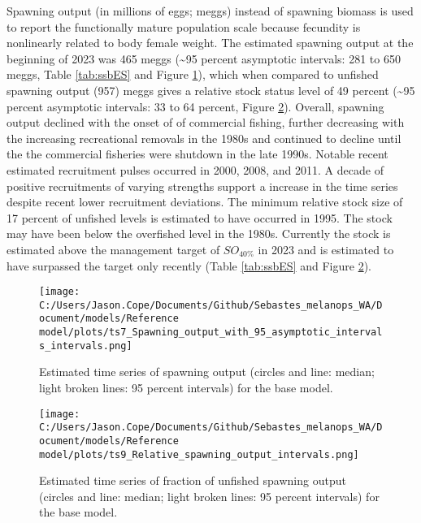 \documentclass[11pt,
  english,
  letterpaper,
]{article}
\begin{document}
Spawning output (in millions of eggs; meggs) instead of spawning biomass is used to report the functionally mature population scale because fecundity is nonlinearly related to body female weight. The estimated spawning output at the beginning of 2023 was 465 meggs (\textasciitilde95 percent asymptotic intervals: 281 to 650 meggs, Table \ref{tab:ssbES} and Figure \ref{fig:es-ssb}), which when compared to unfished spawning output (957) meggs gives a relative stock status level of 49 percent (\textasciitilde95 percent asymptotic intervals: 33 to 64 percent, Figure \ref{fig:es-depl}). Overall, spawning output declined with the onset of of commercial fishing, further decreasing with the increasing recreational removals in the 1980s and continued to decline until the the commercial fisheries were shutdown in the late 1990s. Notable recent estimated recruitment pulses occurred in 2000, 2008, and 2011. A decade of positive recruitments of varying strengths support a increase in the time series despite recent lower recruitment deviations. The minimum relative stock size of 17 percent of unfished levels is estimated to have occurred in 1995. The stock may have been below the overfished level in the 1980s. Currently the stock is estimated above the management target of \(SO_{40\%}\) in 2023 and is estimated to have surpassed the target only recently (Table \ref{tab:ssbES} and Figure \ref{fig:es-depl}).



\begin{figure}
\centering
\texttt{[image: C:/Users/Jason.Cope/Documents/Github/Sebastes\_melanops\_WA/Document/models/Reference model/plots/ts7\_Spawning\_output\_with\_95\_asymptotic\_intervals\_intervals.png]}
\caption{Estimated time series of spawning output (circles and line: median; light broken lines: 95 percent intervals) for the base model.\label{fig:es-ssb}}
\end{figure}

\begin{figure}
\centering
\texttt{[image: C:/Users/Jason.Cope/Documents/Github/Sebastes\_melanops\_WA/Document/models/Reference model/plots/ts9\_Relative\_spawning\_output\_intervals.png]}
\caption{Estimated time series of fraction of unfished spawning output (circles and line: median; light broken lines: 95 percent intervals) for the base model.\label{fig:es-depl}}
\end{figure}

\clearpage
\end{document}
